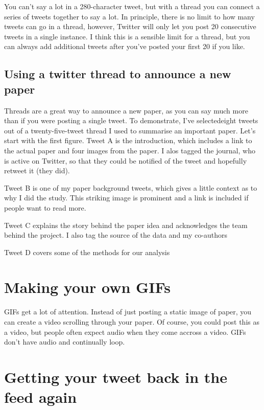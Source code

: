 \documentclass[]{book}
\begin{document}
You can't say a lot in a 280-character tweet, but with a thread you can connect a series of tweets together to say a lot. In principle, there is no limit to how many tweets can go in a thread, however, Twitter will only let you post 20 consecutive tweets in a single instance. I think this is a sensible limit for a thread, but you can always add additional tweets after you've posted your first 20 if you like.

\hypertarget{using-a-twitter-thread-to-announce-a-new-paper}{%
\subsection{Using a twitter thread to announce a new paper}\label{using-a-twitter-thread-to-announce-a-new-paper}}

Threads are a great way to announce a new paper, as you can say much more than if you were posting a single tweet. To demonstrate, I've selectedeight tweets out of a twenty-five-tweet thread I used to summarise an important paper. Let's start with the first figure. Tweet A is the introduction, which includes a link to the actual paper and four images from the paper. I alos tagged the journal, who is active on Twitter, so that they could be notified of the tweet and hopefully retweet it (they did).

Tweet B is one of my paper background tweets, which gives a little context as to why I did the study. This striking image is prominent and a link is included if people want to read more.

Tweet C explains the story behind the paper idea and acknowledges the team behind the project. I also tag the source of the data and my co-authors

Tweet D covers some of the methods for our analysis

\hypertarget{making-your-own-gifs}{%
\section{Making your own GIFs}\label{making-your-own-gifs}}

GIFs get a lot of attention. Instead of just posting a static image of paper, you can create a video scrolling through your paper. Of course, you could post this as a video, but people often expect audio when they come accross a video. GIFs don't have audio and continually loop.

\hypertarget{getting-your-tweet-back-in-the-feed-again}{%
\section{Getting your tweet back in the feed again}\label{getting-your-tweet-back-in-the-feed-again}}
\end{document}

